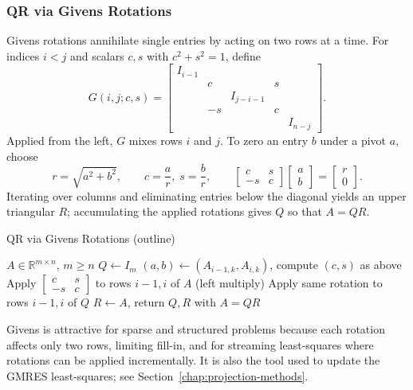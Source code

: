 \subsubsection{QR via Givens Rotations}
\label{subsec:givens-qr}
Givens rotations annihilate single entries by acting on two rows at a time. For indices $i<j$ and scalars $c,s$ with $c^2+s^2=1$, define
\[
    G(i,j;c,s)=\begin{bmatrix}
        I_{i-1}                         \\
         & c  &           & s           \\
         &    & I_{j-i-1} &             \\
         & -s &           & c           \\
         &    &           &   & I_{n-j}
    \end{bmatrix}.
\]
Applied from the left, $G$ mixes rows $i$ and $j$. To zero an entry $b$ under a pivot $a$, choose
\[
    r=\sqrt{a^2+b^2},\qquad c=\frac{a}{r},\; s=\frac{b}{r},\qquad \begin{bmatrix}c&s\\-s&c\end{bmatrix}\begin{bmatrix}a\\ b\end{bmatrix}=\begin{bmatrix}r\\ 0\end{bmatrix}.
\]
Iterating over columns and eliminating entries below the diagonal yields an upper triangular $R$; accumulating the applied rotations gives $Q$ so that $A=QR$.
\begin{algorithm}[H]
    \caption{QR via Givens Rotations (outline)}
    \begin{algorithmic}[0]
        \Require $A\in\mathbb{R}^{m\times n}$, $m\ge n$
        \State $Q\gets I_m$
        \State $(a,b)\gets (A_{i-1,k},A_{i,k})$, compute $(c,s)$ as above
        \State Apply $\begin{bmatrix}c&s\\-s&c\end{bmatrix}$ to rows $i-1,i$ of $A$ (left multiply)
        \State Apply same rotation to rows $i-1,i$ of $Q$
        \EndFor
        \EndFor
        \State $R\gets A$, return $Q,R$ with $A=QR$
    \end{algorithmic}
\end{algorithm}
Givens is attractive for sparse and structured problems because each rotation affects only two rows, limiting fill-in, and for streaming least-squares where rotations can be applied incrementally. It is also the tool used to update the GMRES least-squares; see Section~\ref{chap:projection-methods}.
